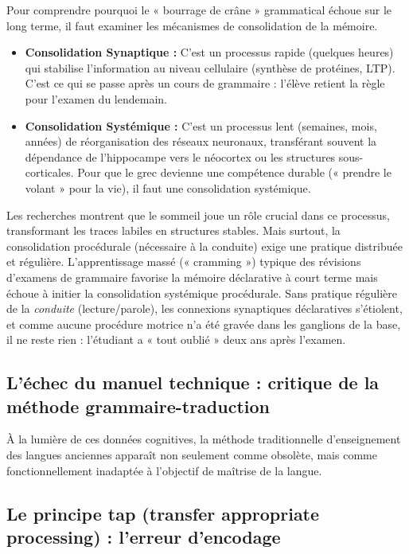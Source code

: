 Pour comprendre pourquoi le « bourrage de crâne » grammatical échoue sur le long terme, il faut
examiner les mécanismes de consolidation de la mémoire.

\begin{itemize}\item \textbf{Consolidation Synaptique :} C'est un processus rapide (quelques heures) qui stabilise l'information au niveau cellulaire (synthèse de protéines, LTP). C'est ce qui se passe après un cours de grammaire : l'élève retient la règle pour l'examen du lendemain.\cite{III-3-3-ref31}\item \textbf{Consolidation Systémique :} C'est un processus lent (semaines, mois, années) de réorganisation des réseaux neuronaux, transférant souvent la dépendance de l'hippocampe vers le néocortex ou les structures sous-corticales. Pour que le grec devienne une compétence durable (« prendre le volant » pour la vie), il faut une consolidation systémique.\cite{III-3-3-ref33}\end{itemize}Les recherches montrent que le sommeil joue un rôle crucial dans ce processus, transformant les
traces labiles en structures stables.\cite{III-3-3-ref35} Mais surtout, la consolidation procédurale
(nécessaire à la conduite) exige une pratique distribuée et régulière. L'apprentissage massé («
cramming ») typique des révisions d'examens de grammaire favorise la mémoire déclarative à court
terme mais échoue à initier la consolidation systémique procédurale. Sans pratique régulière de la
\textit{conduite} (lecture/parole), les connexions synaptiques déclaratives s'étiolent, et comme
aucune procédure motrice n'a été gravée dans les ganglions de la base, il ne reste rien : l'étudiant
a « tout oublié » deux ans après l'examen.\cite{III-3-3-ref36}



\subsection{L'échec du manuel technique : critique de la méthode grammaire-traduction}

À la lumière de ces données cognitives, la méthode traditionnelle d'enseignement des langues
anciennes apparaît non seulement comme obsolète, mais comme fonctionnellement inadaptée à l'objectif
de maîtrise de la langue.



\subsection{Le principe tap (transfer appropriate processing) : l'erreur d'encodage}

